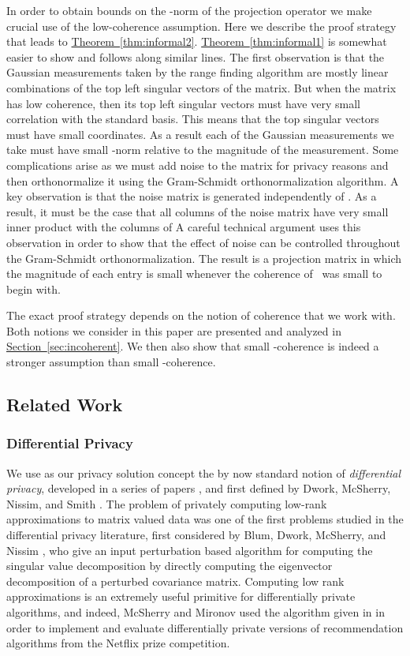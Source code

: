 \documentclass[letterpaper,11pt]{article}
\theoremstyle{definition}
\newcommand{\sectionref}[1]{\hyperref[sec:#1]{Section~\ref{sec:#1}}}
\newcommand{\theoremref}[1]{\hyperref[thm:#1]{Theorem~\ref{thm:#1}}}
\begin{document}
In order to obtain bounds on the -norm of the projection operator
we make crucial use of the low-coherence assumption. Here we describe the
proof strategy that leads to \theoremref{informal2}. \theoremref{informal1} is
somewhat easier to show and follows along similar lines.
The first observation is that the Gaussian measurements
taken by the range finding algorithm are mostly linear combinations of the top
left singular vectors of the matrix. But when the matrix  has low coherence,
then its top left singular vectors must have very small correlation with the
standard basis. This means that the top singular vectors must have small
coordinates. As a result each of the Gaussian measurements we take must have
small -norm relative to the magnitude of the measurement. Some
complications arise as we must add noise to the matrix  for privacy reasons and
then orthonormalize it using the Gram-Schmidt orthonormalization algorithm.
A key observation is that the noise matrix is generated independently of .
As a result, it must be the case that all columns of the noise matrix have
very small inner product with the columns of  A careful technical argument
uses this observation in order to show that the effect of noise can be
controlled throughout the Gram-Schmidt orthonormalization. The result is a
projection matrix in which the magnitude of each entry is small whenever the
coherence of~ was small to begin with.

The exact proof strategy depends on the notion of coherence that we work with.
Both notions we consider in this paper are presented and analyzed in
\sectionref{incoherent}. We then also show that small -coherence is indeed a
stronger assumption than small -coherence.

\subsection{Related Work}
\subsubsection{Differential Privacy}
We use as our privacy solution concept the by now standard notion of
\emph{differential privacy}, developed in a series of papers \cite{BlumDMN05,
ChawlaDMSW05,DworkMNS06}, and first defined by Dwork, McSherry, Nissim, and Smith
\cite{DworkMNS06}. The problem of privately computing low-rank approximations to
matrix valued data was one of the first problems studied in the differential
privacy literature, first considered by Blum, Dwork, McSherry, and Nissim
\cite{BlumDMN05}, who give an input perturbation based algorithm for computing
the singular value decomposition by directly computing the eigenvector
decomposition of a perturbed covariance matrix. Computing low rank
approximations is an extremely useful primitive for differentially private
algorithms, and indeed, McSherry and Mironov \cite{McSherryM09} used the algorithm
given in \cite{BlumDMN05} in order to implement and evaluate differentially
private versions of recommendation algorithms from the Netflix prize
competition.
\end{document}
